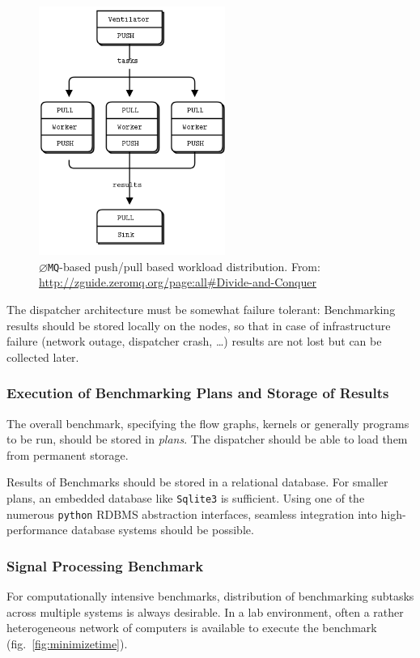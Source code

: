 \documentclass[a4paper]{IEEEtran}
\newcommand{\zeromq}{\texttt{$\varnothing$MQ}\xspace}
\begin{document}
\begin{figure}[h] \centering \includegraphics[width=2.4in]{pushpull.png}
\caption{\label{fig:pushpull}\zeromq-based push/pull based workload
distribution. From:
\url{http://zguide.zeromq.org/page:all\#Divide-and-Conquer}} \end{figure}

The dispatcher architecture must be somewhat failure tolerant: Benchmarking
results should be stored locally on the nodes, so that in case of
infrastructure failure (network outage, dispatcher crash, \dots) results are
not lost but can be collected later.

\subsubsection*{Execution of Benchmarking Plans and Storage of Results}

The overall benchmark, specifying the flow graphs, kernels or generally programs 
to be run, should be stored in \emph{plans}. The dispatcher should be able to load them
from permanent storage.

Results of Benchmarks should be stored in a relational database. For smaller plans,
an embedded database like \texttt{Sqlite3} is sufficient. Using one of the numerous
\texttt{python} RDBMS abstraction interfaces, seamless integration into high-performance
database systems should be possible.

\subsubsection*{Signal Processing Benchmark}

For computationally intensive benchmarks, distribution of benchmarking subtasks
across multiple systems is always desirable. In a lab environment, often a
rather heterogeneous network of computers is available to execute the benchmark
(fig.~\ref{fig:minimizetime}).
\end{document}
